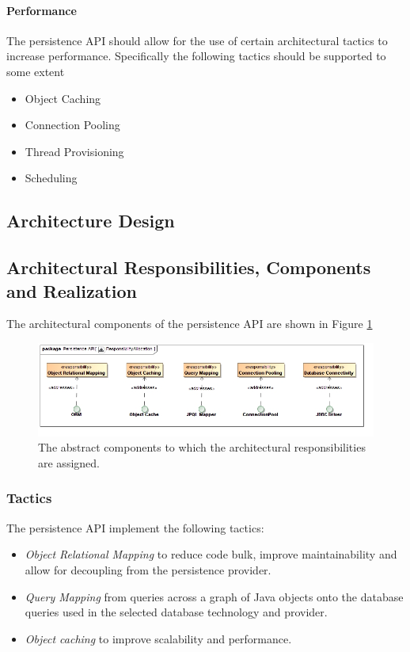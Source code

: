 \paragraph*{Performance}
The persistence API should allow for the use of certain architectural tactics
to increase performance. Specifically the following tactics should be supported
to some extent
\begin{itemize}
	\item Object Caching
	\item Connection Pooling
	\item Thread Provisioning
	\item Scheduling
\end{itemize}



\subsection{Architecture Design}
\subsection{Architectural Responsibilities, Components and Realization}
The architectural components of the persistence API are shown in Figure \ref{fig:persistenceResponsibilityAllocation}
\begin{figure}[H]
	\begin{center}
	\includegraphics[scale=0.5]{../Diagrams and Charts/Persistence API/ResponsibilityAllocation.jpg}
	\caption{The abstract components to which the architectural responsibilities are assigned.}
	\label{fig:persistenceResponsibilityAllocation}
	\end{center}
\end{figure}

\subsubsection{Tactics}
The persistence API implement the following tactics:
\begin{itemize}
	\item \textit{Object Relational Mapping} to reduce code bulk, improve
		maintainability and allow for decoupling from the persistence
		provider.
	\item \textit{Query Mapping} from queries across a graph of Java objects
		onto the database queries used in the selected database
		technology and provider.
	\item \textit{Object caching} to improve scalability and performance.
\end{itemize}


